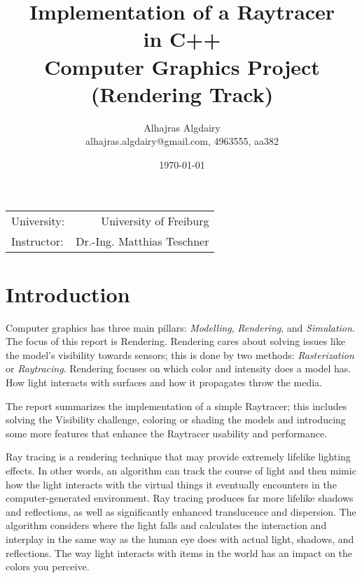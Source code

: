 \documentclass{article}
\title{Implementation of a Raytracer \\ in C++ \\ Computer Graphics Project (Rendering Track)} %
\author{Alhajras Algdairy \\alhajras.algdairy@gmail.com, 4963555, aa382} %
\date{\today} %
\begin{document}
	
	\maketitle %
	
	\begin{center}
		\begin{tabular}{l r}
			University: & University of Freiburg \\ %
			Instructor: &Dr.-Ing. Matthias Teschner %
		\end{tabular}
	\end{center}
	\clearpage
	
	\tableofcontents
	\clearpage
	\section{Introduction}
	Computer graphics has three main pillars: \textit{Modelling}, \textit{Rendering}, and \textit{Simulation}. The focus of this report is Rendering. Rendering cares about solving issues like the model's visibility towards sensors; this is done by two methods: \textit{Rasterization} or \textit{Raytracing}. Rendering focuses on which color and intensity does a model has. How light interacts with surfaces and how it propagates throw the media.
	
	The report summarizes the implementation of a simple Raytracer; this includes solving the Visibility challenge, coloring or shading the models and introducing some more features that enhance the Raytracer usability and performance.
	
	\vspace*{5px}
	Ray tracing is a rendering technique that may provide extremely lifelike lighting effects. In other words, an algorithm can track the course of light and then mimic how the light interacts with the virtual things it eventually encounters in the computer-generated environment. Ray tracing produces far more lifelike shadows and reflections, as well as significantly enhanced translucence and dispersion. The algorithm considers where the light falls and calculates the interaction and interplay in the same way as the human eye does with actual light, shadows, and reflections. The way light interacts with items in the world has an impact on the colors you perceive.
	
\end{document}
